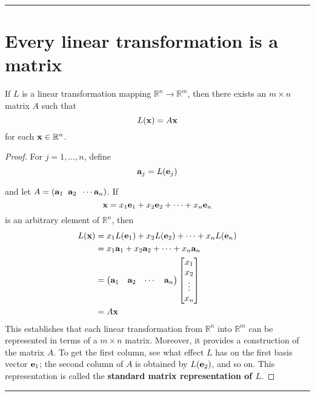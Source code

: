 

\rule[0.01in]{\textwidth}{0.0025in}


\section{Every linear transformation is a matrix}
\begin{theorem}
	If $L$ is a linear transformation mapping  $\mathbb{R}^n \to \mathbb{R}^m$, then there exists an $m \times n$ matrix $A$ such that $$L({\bf x}) = A{\bf x}$$
	for each ${\bf x} \in \mathbb{R}^n$.  
	
	\begin{proof}
		For $j = 1, \dots, n$, define
		\[  {\bf a}_j = L({\bf e}_j)  \]
		
		and let $A = ({\bf a}_1 \;  \;  {\bf a}_2 \; \; \cdots {\bf a}_n )$.  If
		\[ {\bf x} = x_1 {\bf e}_1 + x_2 {\bf e}_2 + \cdots + x_n {\bf e}_n  \]
		is an arbitrary element of $\mathbb{R}^n$, then 
		\begin{align*}
			L({\bf x}) &= x_1 L({\bf e}_1) + x_2 L({\bf e}_2) + \cdots + x_n L({\bf e}_n)\\
			&= x_1 {\bf a}_1 + x_2 {\bf a}_2 + \cdots + x_n {\bf a}_n\\
			&=\begin{pmatrix} {\bf a}_1 &   {\bf a}_2 &  \cdots &  {\bf a}_n \end{pmatrix} \begin{bmatrix}x_1 \\ x_2 \\ \vdots \\ x_n \end{bmatrix}  \\
			& = A {\bf x}
		\end{align*}
		This establishes that each linear transformation from $\mathbb{R}^n$ into $\mathbb{R}^m$ can be represented in terms of a $m \times n$ matrix.  Moreover, it provides a construction of the matrix $A$.  To get the first column, see what effect $L$ has on the first basis vector ${\bf e}_1$;  the second column of $A$ is obtained by $L({\bf e}_2)$, and so on.  This representation is called the \textbf{standard matrix representation of $L$}.
	\end{proof}
\end{theorem}


\rule[0.01in]{\textwidth}{0.0025in}






